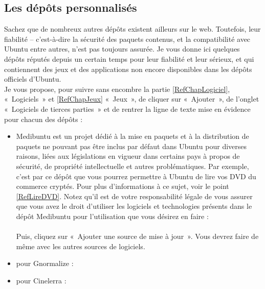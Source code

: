 \subsection{Les dépôts personnalisés}	
Sachez que de nombreux autres dépôts existent ailleurs sur le web. Toutefois, leur fiabilité -- c'est-à-dire la sécurité des paquets contenus, et la compatibilité avec Ubuntu entre autres, n'est pas toujours assurée. Je vous donne ici quelques dépôts réputés depuis un certain temps pour leur fiabilité et leur sérieux, et qui contiennent des jeux et des applications non encore disponibles dans les dépôts officiels d'Ubuntu.\\
Je vous propose, pour suivre sans encombre la partie \ref{RefChapLogiciel}, «~Logiciels~» et \ref{RefChapJeux} «~Jeux~», de cliquer sur «~Ajouter~», de l'onglet «~Logiciels de tierces parties~» et de rentrer la ligne de texte mise en évidence pour chacun des dépôts :
\begin{itemize}
\item Medibuntu est un projet dédié à la mise en paquets et à la distribution de paquets ne pouvant pas être inclus par défaut dans Ubuntu pour diverses raisons, liées aux législations en vigueur dans certains pays à propos de sécurité, de propriété intellectuelle et autres problématiques. Par exemple, c'est par ce dépôt que vous pourrez permettre à Ubuntu de lire vos DVD du commerce cryptés. Pour plus d'informations à ce sujet, voir le point \ref{RefLireDVD}. Notez qu'il est de votre responsabilité légale de vous assurer que vous avez le droit d'utiliser les logiciels et technologies présents dans le dépôt Medibuntu pour l'utilisation que vous désirez en faire :\\
\\
Puis, cliquez sur «~Ajouter une source de mise à jour~». Vous devrez faire de même avec les autres sources de logiciels.\par
\item pour Gnormalize :\\
\par
\item pour Cinelerra :\\
\par
\end{itemize}\par
